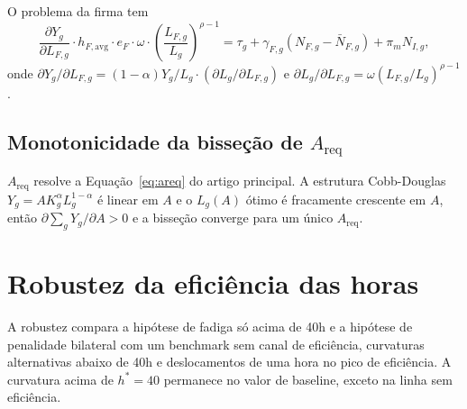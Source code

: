 \documentclass[12pt,a4paper]{article}
\begin{document}
O problema da firma tem
\begin{equation}\label{eq:foc_NF}
\frac{\partial Y_g}{\partial L_{F,g}}\cdot h_{F,\text{avg}}\cdot e_F\cdot\omega\cdot\left(\frac{L_{F,g}}{L_g}\right)^{\rho-1}=\tau_g+\gamma_{F,g}(N_{F,g}-\bar{N}_{F,g})+\pi_m N_{I,g},
\end{equation}
onde $\partial Y_g/\partial L_{F,g}=(1-\alpha)Y_g/L_g\cdot(\partial L_g/\partial L_{F,g})$ e $\partial L_g/\partial L_{F,g}=\omega(L_{F,g}/L_g)^{\rho-1}$.

\subsection{Monotonicidade da bisse\c{c}\~ao de $A_{\text{req}}$}

$A_{\text{req}}$ resolve a Equa\c{c}\~ao~\eqref{eq:areq} do artigo principal. A estrutura Cobb-Douglas $Y_g=A K_g^\alpha L_g^{1-\alpha}$ \'e linear em $A$ e o $L_g(A)$ \'otimo \'e fracamente crescente em $A$, ent\~ao $\partial\sum_g Y_g/\partial A>0$ e a bisse\c{c}\~ao converge para um \'unico $A_{\text{req}}$.

\clearpage
\section{Robustez da efici\^encia das horas}\label{app:hours_efficiency}

A robustez compara a hip\'otese de fadiga s\'o acima de 40h e a hip\'otese de penalidade bilateral com um benchmark sem canal de efici\^encia, curvaturas alternativas abaixo de 40h e deslocamentos de uma hora no pico de efici\^encia. A curvatura acima de $h^*=40$ permanece no valor de baseline, exceto na linha sem efici\^encia.



\clearpage


\end{document}
